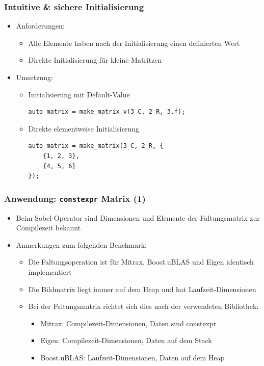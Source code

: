 \documentclass{beamer}
\begin{document}
\begin{frame}[fragile]
    \frametitle{Intuitive \& sichere Initialisierung}
    \begin{itemize}
        \item Anforderungen:
        \begin{itemize}
            \item Alle Elemente haben nach der Initialisierung einen definierten Wert
            \item Direkte Initialisierung für kleine Matritzen
        \end{itemize}
    \item Umsetzung:
    \begin{itemize}
        \item Initialisierung mit Default-Value
\begin{verbatim}
auto matrix = make_matrix_v(3_C, 2_R, 3.f);
\end{verbatim}
        \item Direkte elementweise Initialisierung
\begin{verbatim}
auto matrix = make_matrix(3_C, 2_R, {
    {1, 2, 3},
    {4, 5, 6}
});
\end{verbatim}
\end{itemize}
\end{itemize}
\end{frame}
\begin{frame}
    \frametitle{Anwendung: \texttt{constexpr} Matrix (1)}
    \begin{itemize}
        \item Beim Sobel-Operator sind Dimensionen und Elemente der Faltungsmatrix zur Compilezeit bekannt
        \item Anmerkungen zum folgenden Benchmark:
        \begin{itemize}
            \item Die Faltungsoperation ist für Mitrax, Boost.uBLAS und Eigen identisch implementiert
            \item Die Bildmatrix liegt immer auf dem Heap und hat Laufzeit-Dimensionen
            \item Bei der Faltungsmatrix richtet sich dies nach der verwendeten Bibliothek:
            \begin{itemize}
                \item Mitrax: Compilezeit-Dimensionen, Daten sind constexpr
                \item Eigen: Compilezeit-Dimensionen, Daten auf dem Stack
                \item Boost.uBLAS: Laufzeit-Dimensionen, Daten auf dem Heap
            \end{itemize}
        \end{itemize}
    \end{itemize}
\end{frame}
\end{document}
